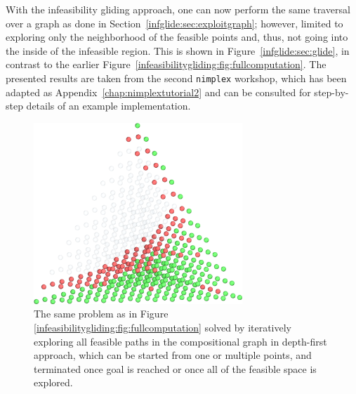 With the infeasibility gliding approach, one can now perform the same traversal over a graph as done in Section~\ref{infglide:sec:exploitgraph}; however, limited to exploring only the neighborhood of the feasible points and, thus, not going into the inside of the infeasible region. This is shown in Figure~\ref{infglide:sec:glide}, in contrast to the earlier Figure~\ref{infeasibilitygliding:fig:fullcomputation}. The presented results are taken from the second \texttt{nimplex} workshop, which has been adapted as Appendix~\ref{chap:nimplextutorial2} and can be consulted for step-by-step details of an example implementation.

\begin{figure}[H]
    \centering
    \includegraphics[width=0.7\textwidth]{infeasibilitygliding/InfeasibilityGliding_Glide.png}
    \caption{The same problem as in Figure \ref{infeasibilitygliding:fig:fullcomputation} solved by iteratively exploring all feasible paths in the compositional graph in depth-first approach, which can be started from one or multiple points, and terminated once goal is reached or once all of the feasible space is explored.}
    \label{infeasibilitygliding:fig:glide}
\end{figure}


\printbibliography[heading=subbibintoc]